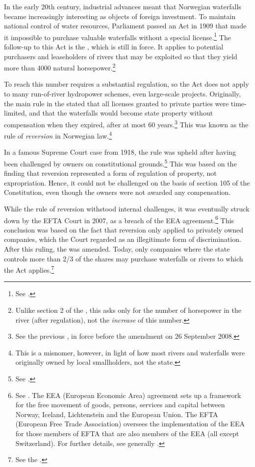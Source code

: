In the early 20th century, industrial advances meant that Norwegian waterfalls became increasingly interesting as objects of foreign investment. To maintain national control of water resources, Parliament passed an Act in 1909 that made it impossible to purchase valuable waterfalls without a special license.\footnote{See \cite[59]{falkanger87}.} The follow-up to this Act is the \cite{ica17}, which is still in force. It applies to potential purchasers and leaseholders of rivers that may be exploited so that they yield more than 4000 natural horsepower.\footnote{Unlike section 2 of the \cite{wra17}, this asks only for the number of horsepower in the river (after regulation), not the {\it increase} of this number.}

To reach this number requires a substantial regulation, so the Act does not apply to many run-of-river hydropower schemes, even large-scale projects. Originally, the main rule in the \cite{ica17} stated that all licenses granted to private parties were time-limited, and that the waterfalls would become state property without compensation when they expired, after at most 60 years.\footnote{See the previous \dni\cite[2]{ica17}, in force before the amendment on 26 September 2008.} This was known as the rule of {\it reversion} in Norwegian law.\footnote{This is a misnomer, however, in light of how most rivers and waterfalls were originally owned by local smallholders, not the state.}

In a famous Supreme Court case from 1918, the rule was upheld after having been challenged by owners on constitutional grounds.\footnote{See \cite{johansen18}.} This was based on the finding that reversion represented a form of regulation of property, not expropriation. Hence, it could not be challenged on the basis of section 105 of the Constitution, even though the owners were not awarded any compensation. 

While the rule of reversion withstood internal challenges, it was eventually struck down by the EFTA Court in 2007, as a breach of the EEA agreement.\footnote{See \cite{efta07}. The EEA (European Economic Area) agreement sets up a framework for the free movement of goods, persons, services and capital between Norway, Iceland, Lichtenstein and the European Union. The EFTA (European Free Trade Association) oversees the implementation of the EEA for those members of EFTA that are also members of the EEA (all except Switzerland). For further details, see generally \cite{bull94,magnussen02,fredriksen09}.} This conclusion was based on the fact that reversion only applied to privately owned companies, which the Court regarded as an illegitimate form of discrimination. After this ruling, the \cite{ica17} was amended. Today, only companies where the state controls more than 2/3 of the shares may purchase waterfalls or rivers to which the Act applies.\footnote{See the \dni\cite[2]{ica17}.}

